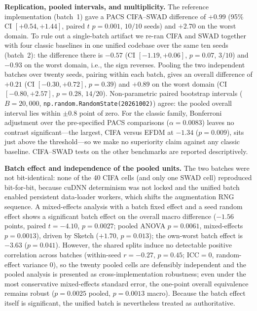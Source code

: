 \documentclass[electronics,article,submit,moreauthors]{Definitions/mdpi}
\begin{document}
\textbf{Replication, pooled intervals, and multiplicity.} The reference implementation (batch~1) gave a PACS CIFA--SWAD difference of $+0.99$ (95\% CI $[+0.54,+1.44]$, paired $t$ $p=0.001$, $10/10$ seeds) and $+2.70$ on the worst domain. To rule out a single-batch artifact we re-ran CIFA and SWAD together with four classic baselines in one unified codebase over the same ten seeds (batch~2): the difference there is $-0.57$ (CI $[-1.19,+0.06]$, $p=0.07$, $3/10$) and $-0.93$ on the worst domain, i.e., the sign reverses. Pooling the two independent batches over twenty seeds, pairing within each batch, gives an overall difference of $+0.21$ (CI $[-0.30,+0.72]$, $p=0.39$) and $+0.89$ on the worst domain (CI $[-0.80,+2.57]$, $p=0.28$, $14/20$). Non-parametric paired bootstrap intervals ($B=20{,}000$, \texttt{np.random.RandomState(20261002)}) agree: the pooled overall interval lies within $\pm0.8$ point of zero. For the classic family, Bonferroni adjustment over the pre-specified PACS comparisons ($\alpha=0.0083$) leaves no contrast significant---the largest, CIFA versus EFDM at $-1.34$ ($p=0.009$), sits just above the threshold---so we make no superiority claim against any classic baseline. CIFA--SWAD tests on the other benchmarks are reported descriptively.

\textbf{Batch effect and independence of the pooled units.} The two batches were not bit-identical: none of the 40 CIFA cells (and only one SWAD cell) reproduced bit-for-bit, because cuDNN determinism was not locked and the unified batch enabled persistent data-loader workers, which shifts the augmentation RNG sequence. A mixed-effects analysis with a batch fixed effect and a seed random effect shows a significant batch effect on the overall macro difference ($-1.56$ points, paired $t=-4.10$, $p=0.0027$; pooled ANOVA $p=0.0061$, mixed-effects $p=0.0013$), driven by Sketch ($+1.70$, $p=0.013$); the own-worst batch effect is $-3.63$ ($p=0.041$). However, the shared splits induce no detectable positive correlation across batches (within-seed $r=-0.27$, $p=0.45$; ICC$=0$, random-effect variance $0$), so the twenty pooled cells are defensibly independent and the pooled analysis is presented as cross-implementation robustness; even under the most conservative mixed-effects standard error, the one-point overall equivalence remains robust ($p=0.0025$ pooled, $p=0.0013$ macro). Because the batch effect itself is significant, the unified batch is nevertheless treated as authoritative.
\end{document}
